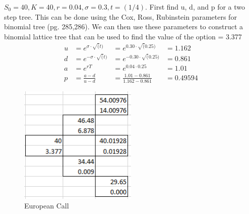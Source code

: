\documentclass[12pt]{article}
\newenvironment{problem}[3][Problem]{\begin{trivlist}
\item[\hskip \labelsep {\bfseries #1}\hskip \labelsep {\bfseries #2.}]}{\end{trivlist}}
\begin{document}
\newpage
\begin{problem}{13.25}. $S_0 = 40, K= 40, r=0.04, \sigma = 0.3, t=(1/4)$. First find u, d, and p for a two step tree. This can be done using the Cox, Ross, Rubinstein parameters for binomial tree (pg. 285,286). We can then use these parameters to construct a binomial lattice tree that can be used to find the value of the option = 3.377 
\begin{align*}
u &= e^{\sigma \cdot \sqrt(t)} &= e^{0.30 \cdot \sqrt(0.25)}  &=  1.162 \\ 
d &= e^{-\sigma \cdot \sqrt(t)} &= e^{-0.30 \cdot \sqrt(0.25)} & = 0.861 \\
a &= e^{rT} &= e^{0.04 \cdot 0.25} &= 1.01 \\
p &= \frac{a-d}{u-d} &= \frac{1.01 - 0.861}{1.162-0.861}  &= 0.49594
\end{align*}

\begin{figure}[h!]
\centering
\includegraphics[width=0.5\textwidth]{mod9_p25.png}
\caption{European Call}
\end{figure}
\end{problem}
\end{document}
